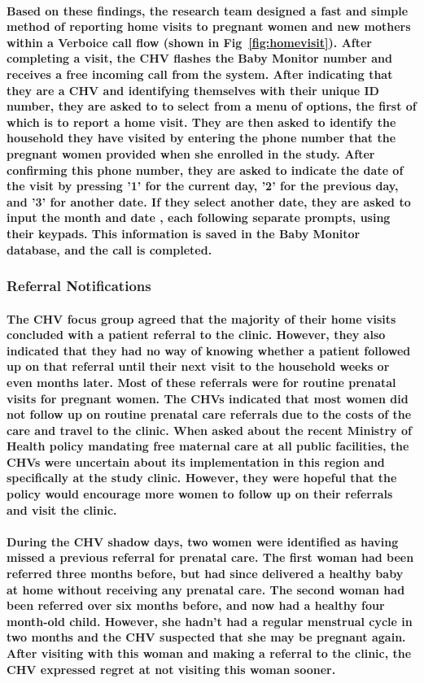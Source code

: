 \paragraph{Based on these findings, the research team designed a fast and simple method of reporting home visits to pregnant women and new mothers within a Verboice call flow (shown in Fig~\ref{fig:homevisit}). After completing a visit, the CHV flashes the Baby Monitor number and receives a free incoming call from the system. After indicating that they are a CHV and identifying themselves with their unique ID number, they are asked to to select from a menu of options, the first of which is to report a home visit. They are then asked to identify the household they have visited by entering the phone number that the pregnant women provided when she enrolled in the study. After confirming this phone number, they are asked to indicate the date of the visit by pressing '1' for the current day, '2' for the previous day, and '3' for another date. If they select another date, they are asked to input the month and date , each following separate prompts, using their keypads. This information is saved in the Baby Monitor database, and the call is completed.}


\subsubsection{Referral Notifications}
\paragraph{The CHV focus group agreed that the majority of their home visits concluded with a patient referral to the clinic. However, they also indicated that they had no way of knowing whether a patient followed up on that referral until their next visit to the household weeks or even months later. Most of these referrals were for routine prenatal visits for pregnant women. The CHVs indicated that most women did not follow up on routine prenatal care referrals due to the costs of the care and travel to the clinic. When asked about the recent Ministry of Health policy mandating free maternal care at all public facilities, the CHVs were uncertain about its implementation in this region and specifically at the study clinic. However, they were hopeful that the policy would encourage more women to follow up on their referrals and visit the clinic.}

\paragraph{During the CHV shadow days, two women were identified as having missed a previous referral for prenatal care. The first woman had been referred three months before, but had since delivered a healthy baby at home without receiving any prenatal care. The second woman had been referred over six months before, and now had a healthy four month-old child. However, she hadn’t had a regular menstrual cycle in two months and the CHV suspected that she may be pregnant again. After visiting with this woman and making a referral to the clinic, the CHV expressed regret at not visiting this woman sooner. }

